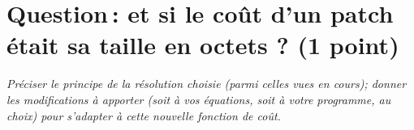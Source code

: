 \documentclass[a4paper, 10pt, french]{article}
\begin{document}
\section{Question\,: et  si le coût d'un patch était sa taille en octets ? (1 point)}
{\em Préciser le principe de la résolution choisie (parmi celles vues en cours); donner  les modifications à apporter (soit à vos  équations, soit à votre programme, au choix)
pour s'adapter à cette nouvelle fonction de coût.
}
\end{document}
